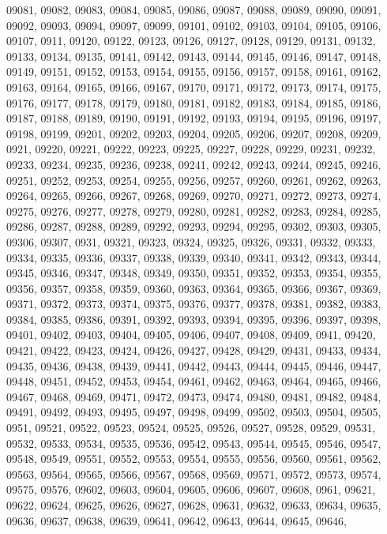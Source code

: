{09081,
09082,
09083,
09084,
09085,
09086,
09087,
09088,
09089,
09090,
09091,
09092,
09093,
09094,
09097,
09099,
09101,
09102,
09103,
09104,
09105,
09106,
09107,
0911,
09120,
09122,
09123,
09126,
09127,
09128,
09129,
09131,
09132,
09133,
09134,
09135,
09141,
09142,
09143,
09144,
09145,
09146,
09147,
09148,
09149,
09151,
09152,
09153,
09154,
09155,
09156,
09157,
09158,
09161,
09162,
09163,
09164,
09165,
09166,
09167,
09170,
09171,
09172,
09173,
09174,
09175,
09176,
09177,
09178,
09179,
09180,
09181,
09182,
09183,
09184,
09185,
09186,
09187,
09188,
09189,
09190,
09191,
09192,
09193,
09194,
09195,
09196,
09197,
09198,
09199,
09201,
09202,
09203,
09204,
09205,
09206,
09207,
09208,
09209,
0921,
09220,
09221,
09222,
09223,
09225,
09227,
09228,
09229,
09231,
09232,
09233,
09234,
09235,
09236,
09238,
09241,
09242,
09243,
09244,
09245,
09246,
09251,
09252,
09253,
09254,
09255,
09256,
09257,
09260,
09261,
09262,
09263,
09264,
09265,
09266,
09267,
09268,
09269,
09270,
09271,
09272,
09273,
09274,
09275,
09276,
09277,
09278,
09279,
09280,
09281,
09282,
09283,
09284,
09285,
09286,
09287,
09288,
09289,
09292,
09293,
09294,
09295,
09302,
09303,
09305,
09306,
09307,
0931,
09321,
09323,
09324,
09325,
09326,
09331,
09332,
09333,
09334,
09335,
09336,
09337,
09338,
09339,
09340,
09341,
09342,
09343,
09344,
09345,
09346,
09347,
09348,
09349,
09350,
09351,
09352,
09353,
09354,
09355,
09356,
09357,
09358,
09359,
09360,
09363,
09364,
09365,
09366,
09367,
09369,
09371,
09372,
09373,
09374,
09375,
09376,
09377,
09378,
09381,
09382,
09383,
09384,
09385,
09386,
09391,
09392,
09393,
09394,
09395,
09396,
09397,
09398,
09401,
09402,
09403,
09404,
09405,
09406,
09407,
09408,
09409,
0941,
09420,
09421,
09422,
09423,
09424,
09426,
09427,
09428,
09429,
09431,
09433,
09434,
09435,
09436,
09438,
09439,
09441,
09442,
09443,
09444,
09445,
09446,
09447,
09448,
09451,
09452,
09453,
09454,
09461,
09462,
09463,
09464,
09465,
09466,
09467,
09468,
09469,
09471,
09472,
09473,
09474,
09480,
09481,
09482,
09484,
09491,
09492,
09493,
09495,
09497,
09498,
09499,
09502,
09503,
09504,
09505,
0951,
09521,
09522,
09523,
09524,
09525,
09526,
09527,
09528,
09529,
09531,
09532,
09533,
09534,
09535,
09536,
09542,
09543,
09544,
09545,
09546,
09547,
09548,
09549,
09551,
09552,
09553,
09554,
09555,
09556,
09560,
09561,
09562,
09563,
09564,
09565,
09566,
09567,
09568,
09569,
09571,
09572,
09573,
09574,
09575,
09576,
09602,
09603,
09604,
09605,
09606,
09607,
09608,
0961,
09621,
09622,
09624,
09625,
09626,
09627,
09628,
09631,
09632,
09633,
09634,
09635,
09636,
09637,
09638,
09639,
09641,
09642,
09643,
09644,
09645,
09646,
}
